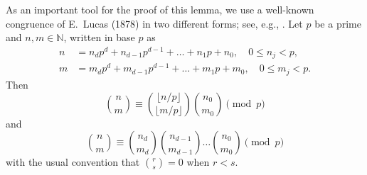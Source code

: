 \documentclass{amsart}
\theoremstyle{plain}
\numberwithin{equation}{section}
\begin{document}
As an important tool for the proof of this lemma, we use a well-known 
congruence of E.~Lucas (1878) in two different forms; see, e.g., \cite{Gr}.
Let $p$ be a prime and $n,m\in{\mathbb N}$, written in base $p$ as
\begin{align*}
n &= n_dp^d+n_{d-1}p^{d-1}+\dots+n_1p+n_0,\quad 0\leq n_j<p,\\
m &= m_dp^d+m_{d-1}p^{d-1}+\dots+m_1p+m_0,\quad 0\leq m_j<p.
\end{align*}
Then
\begin{equation}\label{6.5}
\binom{n}{m}\equiv \binom{\lfloor n/p\rfloor}{\lfloor m/p\rfloor}
\binom{n_0}{m_0}\pmod{p}
\end{equation}
and 
\begin{equation}\label{6.6}
\binom{n}{m}\equiv\binom{n_d}{m_d}\binom{n_{d-1}}{m_{d-1}}\dots
\binom{n_0}{m_0}\pmod{p}
\end{equation}
with the usual convention that $\binom{r}{s}=0$ when $r<s$.
\end{document}
